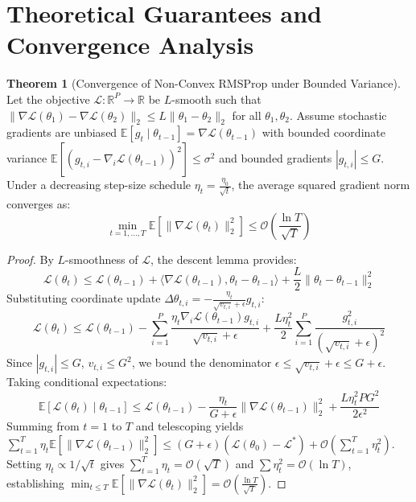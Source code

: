 \documentclass[11pt,a4paper]{article}
\theoremstyle{definition}
\newtheorem{theorem}{Theorem}[section]
\begin{document}
\section{Theoretical Guarantees and Convergence Analysis}

\begin{theorem}[Convergence of Non-Convex RMSProp under Bounded Variance]
Let the objective $\mathcal{L}: \mathbb{R}^P \to \mathbb{R}$ be $L$-smooth such that $\|\nabla \mathcal{L}(\theta_1) - \nabla \mathcal{L}(\theta_2)\|_2 \le L \|\theta_1 - \theta_2\|_2$ for all $\theta_1, \theta_2$. Assume stochastic gradients are unbiased $\mathbb{E}[g_t \mid \theta_{t-1}] = \nabla \mathcal{L}(\theta_{t-1})$ with bounded coordinate variance $\mathbb{E}[(g_{t, i} - \nabla_i \mathcal{L}(\theta_{t-1}))^2] \le \sigma^2$ and bounded gradients $|g_{t, i}| \le G$. Under a decreasing step-size schedule $\eta_t = \frac{\eta_0}{\sqrt{t}}$, the average squared gradient norm converges as:
\begin{equation}
\min_{t=1, \dots, T} \mathbb{E}\left[\|\nabla \mathcal{L}(\theta_t)\|_2^2\right] \le \mathcal{O}\left(\frac{\ln T}{\sqrt{T}}\right)
\end{equation}
\end{theorem}

\begin{proof}
By $L$-smoothness of $\mathcal{L}$, the descent lemma provides:
\begin{equation}
\mathcal{L}(\theta_{t}) \le \mathcal{L}(\theta_{t-1}) + \langle \nabla \mathcal{L}(\theta_{t-1}), \theta_t - \theta_{t-1} \rangle + \frac{L}{2} \|\theta_t - \theta_{t-1}\|_2^2
\end{equation}
Substituting coordinate update $\Delta \theta_{t, i} = -\frac{\eta_t}{\sqrt{v_{t, i}} + \epsilon} g_{t, i}$:
\begin{equation}
\mathcal{L}(\theta_t) \le \mathcal{L}(\theta_{t-1}) - \sum_{i=1}^P \frac{\eta_t \nabla_i \mathcal{L}(\theta_{t-1}) g_{t, i}}{\sqrt{v_{t, i}} + \epsilon} + \frac{L \eta_t^2}{2} \sum_{i=1}^P \frac{g_{t, i}^2}{(\sqrt{v_{t, i}} + \epsilon)^2}
\end{equation}
Since $|g_{t, i}| \le G$, $v_{t, i} \le G^2$, we bound the denominator $\epsilon \le \sqrt{v_{t, i}} + \epsilon \le G + \epsilon$. Taking conditional expectations:
\begin{equation}
\mathbb{E}[\mathcal{L}(\theta_t) \mid \theta_{t-1}] \le \mathcal{L}(\theta_{t-1}) - \frac{\eta_t}{G + \epsilon} \|\nabla \mathcal{L}(\theta_{t-1})\|_2^2 + \frac{L \eta_t^2 P G^2}{2 \epsilon^2}
\end{equation}
Summing from $t=1$ to $T$ and telescoping yields $\sum_{t=1}^T \eta_t \mathbb{E}[\|\nabla \mathcal{L}(\theta_{t-1})\|_2^2] \le (G+\epsilon)(\mathcal{L}(\theta_0) - \mathcal{L}^*) + \mathcal{O}\left(\sum_{t=1}^T \eta_t^2\right)$. Setting $\eta_t \propto 1/\sqrt{t}$ gives $\sum_{t=1}^T \eta_t = \mathcal{O}(\sqrt{T})$ and $\sum \eta_t^2 = \mathcal{O}(\ln T)$, establishing $\min_{t \le T} \mathbb{E}[\|\nabla \mathcal{L}(\theta_t)\|_2^2] = \mathcal{O}\left(\frac{\ln T}{\sqrt{T}}\right)$.
\end{proof}
\end{document}
